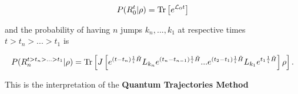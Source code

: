 \begin{equation}
  P(R_{0}^{t}|\rho) = \mathrm{Tr}\left[e^{\mathcal{L}_{0}t}\right]
\end{equation}

and the probability of having $n$ jumps $k_{n},...,k_{1}$ at respective times $t>t_{n}>...>t_{1}$ is

\begin{equation}
  P(R_{n}^{t>t_{n}>...>t_{1}}|\rho) = \mathrm{Tr}\left[J\left[e^{(t-t_{n})\frac{1}{i}\tilde{H}}L_{k_{n}}e^{(t_{n}-t_{n-1})\frac{1}{i}\tilde{H}}...e^{(t_{2}-t_{1})\frac{1}{i}\tilde{H}}L_{k_{1}}e^{t_{1}\frac{1}{i}\tilde{H}}\right]\rho\right].
\end{equation}

This is the interpretation of the \textbf{Quantum Trajectories Method} \cite{wiseman_quantum_2010,hornberger2009introduction}

